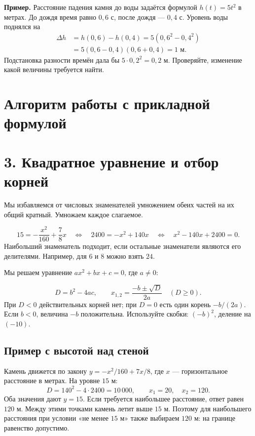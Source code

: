 \documentclass[a4paper,12pt]{article}
\newcommand{\heading}[1]{\section*{\color{darkaccent}#1}}
\newcommand{\subheading}[1]{\subsection*{\color{darkaccent}#1}}
\newcommand{\checkitem}[1]{\par\noindent\makebox[6mm][l]{$\square$}\begin{minipage}[t]{\dimexpr\linewidth-6mm\relax}\raggedright #1\end{minipage}\par}
\begin{document}
\textbf{Пример.} Расстояние падения камня до воды задаётся формулой $h(t)=5t^2$ в метрах. До дождя время равно $0,6$ с, после дождя --- $0,4$ с. Уровень воды поднялся на
\begin{align*}
\Delta h&=h(0,6)-h(0,4)=5(0,6^2-0,4^2)\\
&=5(0,6-0,4)(0,6+0,4)=1\text{ м}.
\end{align*}
Подстановка разности времён дала бы $5\cdot0,2^2=0,2$ м. Проверяйте, изменение какой величины требуется найти.

\clearpage
\heading{Алгоритм работы с прикладной формулой}
\thispagestyle{plain}
\begin{center}
\end{center}
\clearpage

\heading{3. Квадратное уравнение и отбор корней}
\checkitem{Мы избавляемся от числовых знаменателей умножением обеих частей на их общий кратный. Умножаем каждое слагаемое.}
\[
15=-\frac{x^2}{160}+\frac78x
\quad\Longleftrightarrow\quad
2400=-x^2+140x
\quad\Longleftrightarrow\quad
x^2-140x+2400=0.
\]
Наибольший знаменатель подходит, если остальные знаменатели являются его делителями. Например, для $6$ и $8$ можно взять $24$.

\checkitem{Мы решаем уравнение $ax^2+bx+c=0$, где $a\ne0$:}
\[
D=b^2-4ac,\qquad
x_{1,2}=\frac{-b\pm\sqrt D}{2a}\quad(D\ge0).
\]
При $D<0$ действительных корней нет; при $D=0$ есть один корень $-b/(2a)$. Если $b<0$, величина $-b$ положительна. Используйте скобки: $(-b)^2$, деление на $(-10)$.

\subheading{Пример с высотой над стеной}
Камень движется по закону $y=-x^2/160+7x/8$, где $x$ --- горизонтальное расстояние в метрах. На уровне $15$ м:
\[
D=140^2-4\cdot2400=10\,000,\qquad
x_1=20,\quad x_2=120.
\]
Оба значения дают $y=15$. Если требуется наибольшее расстояние, ответ равен $120$ м. Между этими точками камень летит выше $15$ м. Поэтому для наибольшего расстояния при условии «не менее $15$ м» также выбираем $120$ м: на границе равенство допустимо.
\end{document}
